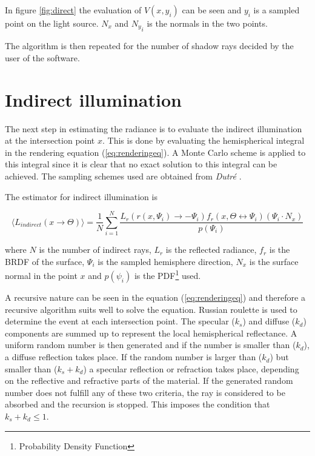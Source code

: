 \documentclass[a4paper]{report}
\begin{document}
In figure \ref{fig:direct} the evaluation of \(V(x,y_i)\) can be seen
and \(y_i\) is a sampled point on the light source. \(N_x\) and
\({N_y}_i\) is the normals in the two points.

The algorithm is then repeated for the number of shadow rays decided
by the user of the software.

\section{Indirect illumination}

The next step in estimating the radiance is to evaluate the indirect
illumination at the intersection point \(x\). This is done by
evaluating the hemispherical integral in the rendering equation
(\ref{eq:renderingeq}). A Monte Carlo scheme is applied to this
integral since it is clear that no exact solution to this integral can
be achieved. The sampling schemes used are obtained from \emph{Dutré} \cite{globalcomp}.

The estimator for indirect illumination is

\begin{equation}
  \langle L_{indirect}(x \to \Theta) \rangle = \frac{1}{N}\sum^N_{i=1}
  \frac{L_r(r(x,\Psi_i) \to -\Psi_i)f_r(x,\Theta \leftrightarrow
    \Psi_i)(\Psi_i \cdot N_x)}{p(\Psi_i)}
  \label{eq:indirest}
\end{equation}

where \(N\) is the number of indirect rays, \(L_r\) is the reflected
radiance, \(f_r\) is the BRDF of the surface, \(\Psi_i\) is the
sampled hemisphere direction, \(N_x\) is the surface normal in the
point \(x\) and \(p(\psi_i)\) is the PDF\footnote{Probability Density
Function} used.

A recursive nature can be seen in the equation (\ref{eq:renderingeq})
and therefore a recursive algorithm suits well to solve the
equation. Russian roulette is used to determine the event at each
intersection point. The specular (\(k_s\)) and diffuse (\(k_d\)) components are summed up
to represent the local hemispherical reflectance. A uniform random
number is then generated and if the number is smaller than (\(k_d\)), a
diffuse reflection takes place. If the random number is larger than
 (\(k_d\)) but smaller than (\(k_s+k_d\)) a specular reflection or
 refraction takes place, depending on the reflective and refractive
 parts of the material. If the generated random number does not
 fulfill any of these two criteria, the ray is considered to be
 absorbed and the recursion is stopped. This imposes the condition
 that \(k_s+k_d \leq 1\).
\end{document}
